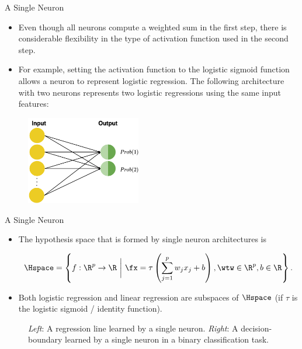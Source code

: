 \begin{vbframe} {A Single Neuron}
\begin{itemize}
\item Even though all neurons compute a weighted sum in the first step, there is considerable flexibility in the type of activation function used in the second step.
\item For example, setting the activation function to the logistic sigmoid function allows a neuron to represent logistic regression. The following architecture with two neurons represents two logistic regressions using the same input features:
\end{itemize}
\begin{figure}
\includegraphics[width=5cm]{figure/logistic_regression.png}
\end{figure}
\end{vbframe}

\begin{vbframe}{A Single Neuron}
\begin{itemize}
\item The hypothesis space that is formed by single neuron architectures is 
\begin{small}
$$\Hspace  = \left\{f: \R^p \to \R ~\bigg|~ \fx = \tau\left(\sum_{j = 1}^p w_j x_j + b\right), \wtw \in \R^p, b \in \R\right\}.$$ 
\end{small}
\item Both logistic regression and linear regression are subspaces of $\Hspace$ (if $\tau$ is the logistic sigmoid / identity function).  \end{itemize}
\vspace*{-0.45cm}
\begin{figure}
\centering
{}
\vspace*{-0.2cm}
\begin{tiny}
\caption{\textit{Left}: A regression line learned by a single neuron. \textit{Right}: A decision-boundary learned by a single neuron in a binary classification task.}
\end{tiny}
\end{figure}
\end{vbframe}

